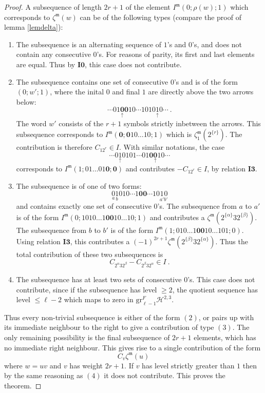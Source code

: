 \documentclass[10pt]{amsart}
\theoremstyle{definition}
\theoremstyle{remark}
\numberwithin{equation}{section}
\newcommand{\gr}{\mathrm{gr}}
\newcommand{\Ho}{\mathcal{H}}
\newcommand{\Io}{\mathbf{I0}}
\newcommand{\Iiii}{\mathbf{I3}}
\newcommand{\zetam}{\zeta^{ \mathfrak{m}}}
\newcommand{\Imot}{I^{\mathfrak{m}}}
\newcommand{\oo}{\mathbf{00}}
\newcommand{\os}{\mathbf{0}}
\begin{document}
\begin{proof} A subsequence of length $2r+1$ of the element $\Imot(0;\rho(w);1)$  which corresponds to $\zetam(w)$ can be of  the following types (compare the proof of lemma \ref{lemdelta}):
\begin{enumerate}
\item The subsequence is an alternating sequence of $1$'s and $0$'s,  and does not contain any consecutive $0$'s.  For reasons of parity, its first and last elements are equal. Thus  by $\Io$, this case does not contribute.
\item The subsequence contains one set of consecutive $0$'s and  is  of the form $(0;w';1)$, where the inital $0$ and final $1$ are directly above  the two arrows below: 
\vspace{-0.03in}
$$\cdots 01\underset{\uparrow}{\os}\os10 \cdots1010\underset{\uparrow}{1}0\cdots\ .$$
The word $w'$ consists of the  $r+1$ symbols  strictly inbetween the arrows. This subsequence corresponds to $\Imot(\os;\os10\ldots 10;1)$ which is $\zetam_1(2^{\{r\}})$. The contribution is therefore
$C_{12^r} \in I$.  With similar notations, the case
\vspace{-0.03in}
$$ \cdots0\underset{\uparrow}{1} 0101 \cdots 01\os \underset{\uparrow}{\os}10\cdots$$
corresponds to $\Imot(1;01\ldots 01\os;\os)$ and contributes $-C_{12^r} \in I$, by relation $\Iiii$.
\item The subsequence is of one of two  forms:
\vspace{-0.03in}
$$\underset{a}{0}\underset{b}{1}010\cdots 1\oo \cdots 10\underset{a'}{1}\underset{b'}{0}$$
and contains exactly one set of consecutive $0$'s. The subsequence from $a$ to $a'$ is of the form 
$\Imot(0;1010\ldots 1\oo 10\ldots 10;1)$ and contributes a $\zetam(2^{\{\alpha\}} 32^{\{\beta\}})$. The subsequence from $b$ to $b'$ is of the form
$\Imot(1;010\ldots 1\oo 10\ldots 101;0)$. Using  relation  $\Iiii$,  this contributes a $(-1)^{2r+1}\zetam(2^{\{\beta\}} 32^{\{\alpha\}})$.
Thus the total contribution of these two subsequences is 
$$C_{2^\alpha 32^\beta } - C_{2^\beta 32^\alpha } \in I\ .$$
\item  The subsequence has at least two sets of consecutive $0$'s. This case does not contribute, since if the subsequence has level $\geq 2$,  the quotient sequence
has level $\leq \ell-2$ which maps to zero in $\gr^F_{\ell-1} \Ho^{2,3}$.
\end{enumerate}
Thus every non-trivial subsequence is either of the form  $(2)$, or pairs up with its immediate neighbour to the right to give a contribution of type $(3)$.
The only remaining possibility is the final subsequence of $2r+1$ elements, which has no immediate right neighbour. This gives rise  to a single contribution  of the form
$$C_v \zetam(u)$$
where $w=uv$ and $v$ has weight $2r+1$. If $v$ has level strictly greater than $1$ then by the same reasoning as $(4)$ it does not contribute. This proves the theorem.
\end{proof}
\end{document}
